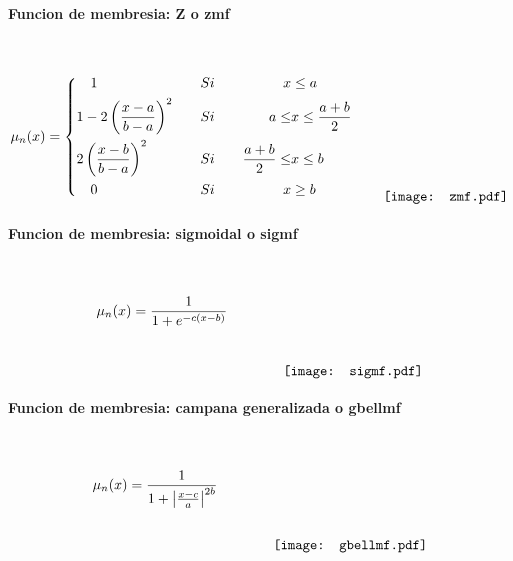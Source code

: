             \paragraph{Funcion de membresia: Z o zmf}$\quad$
                
                \begin{equation*}\label{eq:zmf}
                    \mu_n(x) = \left\{
                        \begin{aligned}
                            &\quad 1  &\quad &Si \quad & x &\leq a\\
                            &1 - 2\left(\frac{x - a}{b - a}\right)^2  &\quad &Si \quad &  a \leq &x \leq \frac{a+b}{2} \\
                            &2\left(\frac{x - b}{b - a}\right)^2  &\quad &Si \quad & \frac{a+b}{2} \leq &x \leq b \\
                            &\quad 0  &\quad &Si \quad & x &\geq b
                        \end{aligned}\right.
                        \qquad
                        \raisebox{-15mm}{\texttt{[image: zmf.pdf]}}
                \end{equation*}

            \paragraph{Funcion de membresia: sigmoidal o sigmf}$\quad$
                
                \begin{equation*}\label{eq:sigmf}
                    \mu_n(x) = \frac{1}{1+e^{-c(x-b)}}
                        \qquad \qquad
                        \raisebox{-15mm}{\texttt{[image: sigmf.pdf]}}
                \end{equation*}
               
            \paragraph{Funcion de membresia: campana generalizada o gbellmf}$\quad$
                
                \begin{equation*}\label{eq:gbellmf}
                    \mu_n(x) = \frac{1}{1+ \left|\frac{x - c}{a}\right|^{2b}}
                        \qquad \qquad
                        \raisebox{-15mm}{\texttt{[image: gbellmf.pdf]}}
                \end{equation*}

